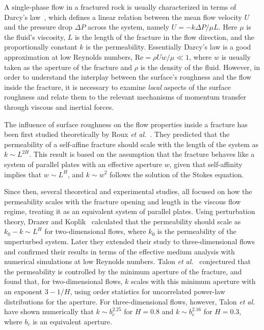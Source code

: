 \documentclass[aps,pre,
superscriptaddress,
twocolumn,
notitlepage,
10pt,
]{revtex4-1}
\begin{document}
A single-phase flow in a fractured rock is usually characterized in terms of
Darcy's law~\cite{Sahimi1994,Sahimi2011, Dullien1992}, which defines a linear
relation between the mean flow velocity $ U $ and the pressure drop $\Delta P$
across the system, namely $U = -k \Delta P/\mu L$. Here $\mu$ is the fluid's
viscosity,  $L$ is the length of the fracture in the flow direction, and the
proportionally constant $k$ is the permeability. Essentially Darcy's law is a
good approximation at low Reynolds numbers,
%
$\mathrm{Re} = \rho U w/\mu \ll 1$, 
%
where $w$ is usually taken as the aperture of the fracture and $\rho$ is the
density of the fluid. However, in order to understand the interplay between the
surface's roughness and the flow inside the fracture, it is necessary to examine
\emph{local} aspects of the surface roughness and relate them to the relevant
mechanisms of momentum transfer through viscous and inertial forces.

The influence of surface roughness on the flow properties inside a fracture
has been first studied theoretically by Roux \emph{et al.}~\cite{Roux1993}.
They predicted that the permeability of a self-affine fracture should scale
with the length of the system as $k \sim L^{2H}$. This result is based on
the assumption that the fracture behaves like a system of parallel plates
with an effective aperture $w$, given that self-affinity implies that $w
\sim L^H$, and $k \sim w^2$ follows the solution of the Stokes equation. 

Since then, several theoretical and experimental studies, all focused on
how the permeability scales with the fracture opening and length in the
viscous flow regime, treating it as an equivalent system of parallel
plates. Using perturbation theory, Drazer and Koplik~\cite{Drazer2000}
calculated that the permeability should scale as $k_0 - k \sim L^H$ for
two-dimensional flows, where $k_0$ is the permeability of the unperturbed
system. Later they extended their study to three-dimensional flows and
confirmed their results in terms of the effective medium analysis with
numerical simulations at low Reynolds numbers.
%
Talon \emph{et al.}~\cite{Talon2010} conjectured that the permeability is
controlled by the minimum aperture of the fracture, and found that, for
two-dimensional flows, $k$ scales with this minimum aperture with an
exponent $3-1/H$, using order statistics for uncorrelated power-law
distributions for the aperture. For three-dimensional flows, however, Talon
\emph{et al.} have shown numerically that $k \sim b_c^{2.25}$ for $H=0.8$
and $k \sim b_c^{2.16}$ for $H=0.3$, where $b_c$ is an equivalent aperture.
\end{document}
